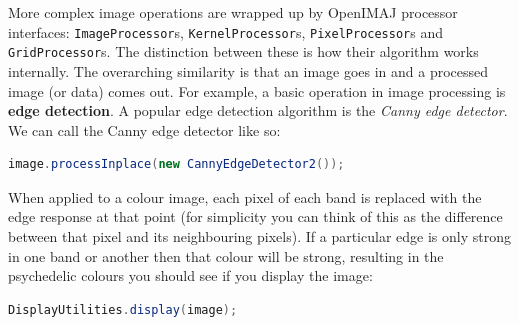 More complex image operations are wrapped up by OpenIMAJ processor interfaces: \verb+ImageProcessor+s, \verb+KernelProcessor+s,
\verb+PixelProcessor+s and \verb+GridProcessor+s. The distinction between these is how their algorithm works internally. The overarching similarity is that an image goes 
in and a processed image (or data) comes out. For example, a basic operation in image processing 
is \textbf{edge detection}. A popular edge detection algorithm is the \emph{Canny edge detector}. 
We can call the Canny edge detector like so:
\begin{lstlisting}[language=java]
image.processInplace(new CannyEdgeDetector2());
\end{lstlisting}
When applied to a colour image, each pixel of each band is replaced with the edge response at 
that point (for simplicity you can think of this as the difference between that pixel and its 
neighbouring pixels). If a particular edge is only strong in one band or another then that 
colour will be strong, resulting in the psychedelic colours you should see if you display 
the image:
\begin{lstlisting}[language=java]
DisplayUtilities.display(image);
\end{lstlisting}

